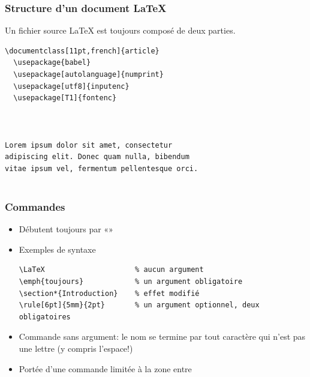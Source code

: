 \begin{frame}[fragile]
  \frametitle{Structure d'un document {\LaTeX}}

  Un fichier source {\LaTeX} est toujours composé de deux parties.

  \begin{minipage}{0.2\linewidth}
  \end{minipage}
  \hfill
  \begin{minipage}{0.75\linewidth}
\begin{lstlisting}[emph={documentclass,begin,end,document}]
\documentclass[11pt,french]{article}
  \usepackage{babel}
  \usepackage[autolanguage]{numprint}
  \usepackage[utf8]{inputenc}
  \usepackage[T1]{fontenc}



Lorem ipsum dolor sit amet, consectetur
adipiscing elit. Donec quam nulla, bibendum
vitae ipsum vel, fermentum pellentesque orci.


\end{lstlisting}
  \end{minipage}
\end{frame}

\begin{frame}[fragile=singleslide]
  \frametitle{Commandes}
  \begin{itemize}
  \item Débutent toujours par «\bs»
  \item Exemples de syntaxe
\begin{lstlisting}
\LaTeX                     % aucun argument
\emph{toujours}            % un argument obligatoire
\section*{Introduction}    % effet modifié
\rule[6pt]{5mm}{2pt}       % un argument optionnel, deux obligatoires
\end{lstlisting}
   \item Commande sans argument: le nom se termine par tout
    caractère qui n'est \alert{pas une lettre} (y compris l'espace!)
  \item Portée d'une commande limitée à la zone entre \code{\{~\}}
  \end{itemize}
\end{frame}

